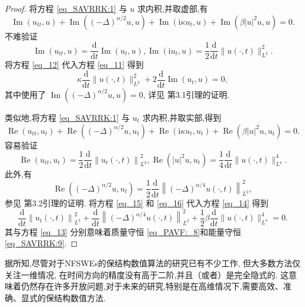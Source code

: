 \begin{proof}
	将方程 \eqref{eq_SAVRRK:1} 与 $u$ 求内积,并取虚部,有
\begin{equation}
\operatorname{Im}\left(u_{t t}, u\right)+\operatorname{Im}\left((-\Delta)^{\alpha / 2} u, u\right)+\operatorname{Im}\left(\mathrm{i} \kappa u_{t}, u\right)+\operatorname{Im}\left(\beta|u|^{2} u, u\right)=0 .
\label{eq_11}\end{equation}
不难验证
\begin{equation}
\operatorname{Im}\left(u_{t t}, u\right)=\frac{\mathrm{d}}{\mathrm{d} t} \operatorname{Im}\left(u_{t}, u\right), \operatorname{Im}\left(\mathrm{i} u_{t}, u\right)=\frac{1}{2} \frac{\mathrm{d}}{\mathrm{d} t}\|u(\cdot, t)\|_{L^{2}}^{2} .
\label{eq_12}\end{equation}
将方程 \eqref{eq_12} 代入方程 \eqref{eq_11} 得到
\begin{equation}
\kappa \frac{\mathrm{d}}{\mathrm{d} t}\|u(\cdot, t)\|_{L^{2}}^{2}+2 \frac{\mathrm{d}}{\mathrm{d} t} \operatorname{Im}\left(u_{t}, u\right)=0,
\label{eq_13}\end{equation}
其中使用了 $\operatorname{Im}\left((-\Delta)^{\alpha / 2} u, u\right)=0$,
详见 \cite{guoExistenceGlobalSmooth2008} 第3.1引理的证明.

类似地,将方程 \eqref{eq_SAVRRK:1} 与 $u_{t}$ 求内积,并取实部,得到
\begin{equation}
\operatorname{Re}\left(u_{t t}, u_{t}\right)+\operatorname{Re}\left((-\Delta)^{\alpha / 2} u, u_{t}\right)+\operatorname{Re}\left(\mathrm{i} \kappa u_{t}, u_{t}\right)+\operatorname{Re}\left(\beta|u|^{2} u, u_{t}\right)=0 .
\label{eq_14}\end{equation}
容易验证
\begin{equation}
\operatorname{Re}\left(u_{t t}, u_{t}\right)=\frac{1}{2} \frac{\mathrm{d}}{\mathrm{d} t}\left\|u_{t}(\cdot, t)\right\|_{L^{2}}^{2}, \operatorname{Re}\left(|u|^{2} u, u_{t}\right)=\frac{1}{4} \frac{\mathrm{d}}{\mathrm{d} t}\|u(\cdot, t)\|_{L^{4}}^{4} .
\label{eq_15}\end{equation}
此外,有
\begin{equation}
\operatorname{Re}\left((-\Delta)^{\alpha / 2} u, u_{t}\right)=\frac{1}{2} \frac{\mathrm{d}}{\mathrm{d} t}\left\|(-\Delta)^{\alpha / 4} u(\cdot, t)\right\|_{L^{2}}^{2},
\label{eq_16}\end{equation}
参见 \cite{guoExistenceGlobalSmooth2008} 第3.2引理的证明.
将方程 \eqref{eq_15} 和 \eqref{eq_16} 代入方程 \eqref{eq_14} 得到
\begin{equation}
\frac{\mathrm{d}}{\mathrm{d} t}\left\|u_{t}(\cdot, t)\right\|_{L^{2}}^{2}+\frac{\mathrm{d}}{\mathrm{d} t}\left\|(-\Delta)^{\alpha / 4} u(\cdot, t)\right\|_{L^{2}}^{2}+\frac{1}{2} \beta \frac{\mathrm{d}}{\mathrm{d} t}\|u(\cdot, t)\|_{L^{4}}^{4}=0 .
\label{eq_17}\end{equation}
其与方程 \eqref{eq_13} 分别意味着质量守恒 \eqref{eq_PAVF:_8}和能量守恒 \eqref{eq_SAVRRK:9}.
\end{proof}
据所知,尽管对于NFSWEs的保结构数值算法的研究已有不少工作, 但大多数方法仅关注一维情况, 在时间方向的精度没有高于二阶,并且（或者）是完全隐式的.
这意味着仍然存在许多开放问题,对于未来的研究,特别是在高维情况下,需要高效、准确、显式的保结构数值方法.

